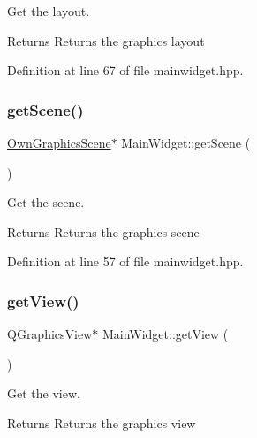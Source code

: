 Get the layout. 

\begin{DoxyReturn}{Returns}
Returns the graphics layout 
\end{DoxyReturn}


Definition at line 67 of file mainwidget.\+hpp.

\mbox{\label{classMainWidget_ad40a8bd13b501a0ebe88c87426a5b591}} 
\subsubsection{\texorpdfstring{get\+Scene()}{getScene()}}
{\footnotesize\ttfamily \mbox{\hyperlink{classOwnGraphicsScene}{Own\+Graphics\+Scene}}$\ast$ Main\+Widget\+::get\+Scene (\begin{DoxyParamCaption}{ }\end{DoxyParamCaption})\hspace{0.3cm}{\ttfamily [inline]}}



Get the scene. 

\begin{DoxyReturn}{Returns}
Returns the graphics scene 
\end{DoxyReturn}


Definition at line 57 of file mainwidget.\+hpp.

\mbox{\label{classMainWidget_ae73e3dac6fb1e99dabe84aab683b3fbd}} 
\subsubsection{\texorpdfstring{get\+View()}{getView()}}
{\footnotesize\ttfamily Q\+Graphics\+View$\ast$ Main\+Widget\+::get\+View (\begin{DoxyParamCaption}{ }\end{DoxyParamCaption})\hspace{0.3cm}{\ttfamily [inline]}}



Get the view. 

\begin{DoxyReturn}{Returns}
Returns the graphics view 
\end{DoxyReturn}


